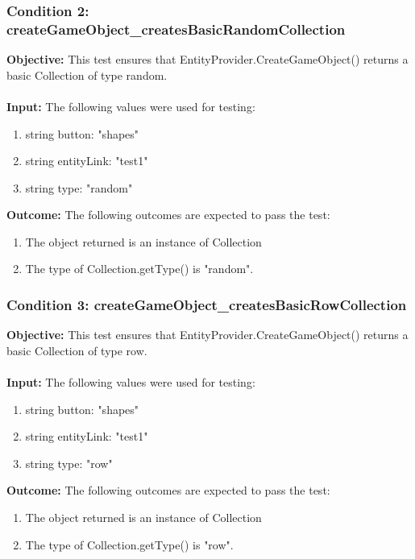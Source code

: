 \documentclass[a4paper,12pt]{article}
\begin{document}
		\subsubsection{Condition 2: createGameObject\_createsBasicRandomCollection}
			\textbf{Objective:} This test ensures that EntityProvider.CreateGameObject() returns a basic Collection of type random.\\\\
			\textbf{Input:} The following values were used for testing:
				\begin{enumerate}
					\item string button: "shapes"
					\item string entityLink: "test1"
					\item string type: "random"
				\end{enumerate}
			\textbf{Outcome:} The following outcomes are expected to pass the test:
				\begin{enumerate}
					\item The object returned is an instance of Collection
					\item The type of Collection.getType() is "random".
				\end{enumerate}
		\subsubsection{Condition 3: createGameObject\_createsBasicRowCollection}
			\textbf{Objective:} This test ensures that EntityProvider.CreateGameObject() returns a basic Collection of type row.\\\\
			\textbf{Input:} The following values were used for testing:
				\begin{enumerate}
					\item string button: "shapes"
					\item string entityLink: "test1"
					\item string type: "row"
				\end{enumerate}
			\textbf{Outcome:} The following outcomes are expected to pass the test:
				\begin{enumerate}
					\item The object returned is an instance of Collection
					\item The type of Collection.getType() is "row".
				\end{enumerate}
\end{document}
